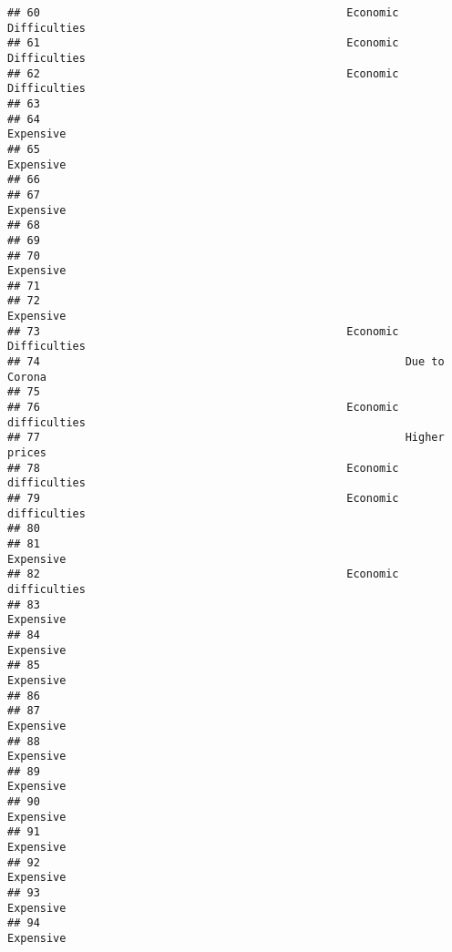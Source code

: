 \documentclass[
]{article}
\begin{document}
\begin{verbatim}
## 60                                               Economic Difficulties 
## 61                                               Economic Difficulties 
## 62                                               Economic Difficulties 
## 63                                                                     
## 64                                                           Expensive 
## 65                                                           Expensive 
## 66                                                                     
## 67                                                           Expensive 
## 68                                                                     
## 69                                                                     
## 70                                                           Expensive 
## 71                                                                     
## 72                                                           Expensive 
## 73                                               Economic Difficulties 
## 74                                                        Due to Corona
## 75                                                                     
## 76                                               Economic difficulties 
## 77                                                        Higher prices
## 78                                               Economic difficulties 
## 79                                               Economic difficulties 
## 80                                                                     
## 81                                                           Expensive 
## 82                                               Economic difficulties 
## 83                                                           Expensive 
## 84                                                           Expensive 
## 85                                                           Expensive 
## 86                                                                     
## 87                                                           Expensive 
## 88                                                           Expensive 
## 89                                                           Expensive 
## 90                                                           Expensive 
## 91                                                           Expensive 
## 92                                                           Expensive 
## 93                                                           Expensive 
## 94                                                           Expensive 

\end{verbatim}
\end{document}
